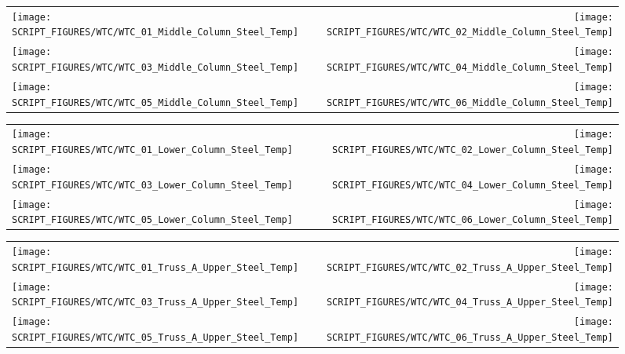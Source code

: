 \begin{figure}[p]
\begin{tabular*}{\textwidth}{l@{\extracolsep{\fill}}r}
\texttt{[image: SCRIPT\_FIGURES/WTC/WTC\_01\_Middle\_Column\_Steel\_Temp]} &
\texttt{[image: SCRIPT\_FIGURES/WTC/WTC\_02\_Middle\_Column\_Steel\_Temp]} \\
\texttt{[image: SCRIPT\_FIGURES/WTC/WTC\_03\_Middle\_Column\_Steel\_Temp]} &
\texttt{[image: SCRIPT\_FIGURES/WTC/WTC\_04\_Middle\_Column\_Steel\_Temp]} \\
\texttt{[image: SCRIPT\_FIGURES/WTC/WTC\_05\_Middle\_Column\_Steel\_Temp]} &
\texttt{[image: SCRIPT\_FIGURES/WTC/WTC\_06\_Middle\_Column\_Steel\_Temp]}
\end{tabular*}
\label{NIST_WTC_Middle_Column_Steel}
\end{figure}

\begin{figure}[p]
\begin{tabular*}{\textwidth}{l@{\extracolsep{\fill}}r}
\texttt{[image: SCRIPT\_FIGURES/WTC/WTC\_01\_Lower\_Column\_Steel\_Temp]} &
\texttt{[image: SCRIPT\_FIGURES/WTC/WTC\_02\_Lower\_Column\_Steel\_Temp]} \\
\texttt{[image: SCRIPT\_FIGURES/WTC/WTC\_03\_Lower\_Column\_Steel\_Temp]} &
\texttt{[image: SCRIPT\_FIGURES/WTC/WTC\_04\_Lower\_Column\_Steel\_Temp]} \\
\texttt{[image: SCRIPT\_FIGURES/WTC/WTC\_05\_Lower\_Column\_Steel\_Temp]} &
\texttt{[image: SCRIPT\_FIGURES/WTC/WTC\_06\_Lower\_Column\_Steel\_Temp]}
\end{tabular*}
\label{NIST_WTC_Lower_Column_Steel}
\end{figure}

\begin{figure}[p]
\begin{tabular*}{\textwidth}{l@{\extracolsep{\fill}}r}
\texttt{[image: SCRIPT\_FIGURES/WTC/WTC\_01\_Truss\_A\_Upper\_Steel\_Temp]} &
\texttt{[image: SCRIPT\_FIGURES/WTC/WTC\_02\_Truss\_A\_Upper\_Steel\_Temp]} \\
\texttt{[image: SCRIPT\_FIGURES/WTC/WTC\_03\_Truss\_A\_Upper\_Steel\_Temp]} &
\texttt{[image: SCRIPT\_FIGURES/WTC/WTC\_04\_Truss\_A\_Upper\_Steel\_Temp]} \\
\texttt{[image: SCRIPT\_FIGURES/WTC/WTC\_05\_Truss\_A\_Upper\_Steel\_Temp]} &
\texttt{[image: SCRIPT\_FIGURES/WTC/WTC\_06\_Truss\_A\_Upper\_Steel\_Temp]}
\end{tabular*}
\label{NIST_WTC_Truss_A_Upper_Steel_Temp}
\end{figure}

